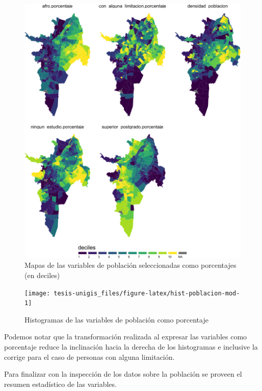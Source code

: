 \documentclass[12pt,]{book}
\begin{document}
\begin{figure}
\includegraphics[width=1\linewidth]{tesis-unigis_files/figure-latex/mapas-poblacion-mod-deciles-1} \caption{Mapas de las variables de población seleccionadas como porcentajes (en deciles)}\label{fig:mapas-poblacion-mod-deciles}
\end{figure}

\begin{figure}
\texttt{[image: tesis-unigis\_files/figure-latex/hist-poblacion-mod-1]} \caption{Histogramas de las variables de población como porcentaje}\label{fig:hist-poblacion-mod}
\end{figure}

Podemos notar que la transformación realizada al expresar las variables
como porcentaje reduce la inclinación hacia la derecha de los
histogramas e inclusive la corrige para el caso de personas con alguna
limitación.

Para finalizar con la inspección de los datos sobre la población se
proveen el resumen estadístico de las variables.
\end{document}
